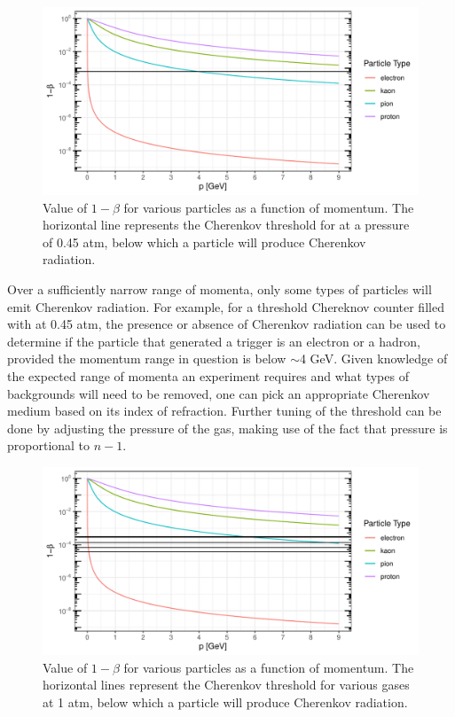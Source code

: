 \begin{figure}[!h]
    \centering
    \includegraphics[width=1.0\textwidth]{chap3/hms_cer_threshold.pdf}
    \caption{Value of $1-\beta$ for various particles as a function of
            momentum. The horizontal line represents the Cherenkov threshold
            for  at a pressure of 0.45 atm, below which a particle
            will produce Cherenkov radiation.
            }
    \label{fig:hms_cer_threshold}
\end{figure}

Over a sufficiently narrow range of momenta, only some types of particles will
emit Cherenkov radiation.
For example, for a threshold Chereknov counter filled with  at
0.45 atm, the presence or absence of Cherenkov radiation can be used to
determine if the particle that generated a trigger is an electron or a hadron,
provided the momentum range in question is below $\sim$4 \si{\giga\eV}.
Given knowledge of the expected range of momenta an experiment requires and
what types of backgrounds will need to be removed, one can pick an appropriate
Cherenkov medium based on its index of refraction. Further tuning of the
threshold can be done by adjusting the pressure of the gas, making use of
the fact that pressure is proportional to $n-1$.

\begin{figure}[!h]
    \centering
    \includegraphics[width=1.0\textwidth]{chap3/cer_gas_thresholds.pdf}
    \caption{Value of $1-\beta$ for various particles as a function of
            momentum. The horizontal lines represent the Cherenkov threshold
            for various gases at 1 atm, below which a particle
            will produce Cherenkov radiation.
            }
    \label{fig:cer_gas_threshold}
\end{figure}

